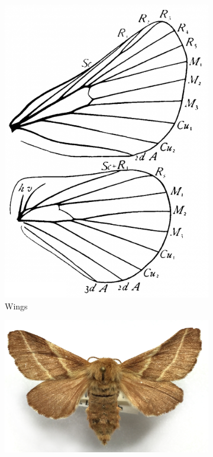 \documentclass[letterpaper, 11pt]{article}
\begin{document}
\begin{figure}[ht!]
    \centering
    \begin{subfigure}[ht!]{0.3\textwidth}
        \includegraphics[width=\textwidth]{LasiocampidWings}
        \caption{Wings \citep[Fig. 69]{comstock1918wings}}
        \label{fig:lasiocampid1}
    \end{subfigure}
    \hfill %
    \begin{subfigure}[ht!]{0.5\textwidth}
        \includegraphics[width=\textwidth]{LasiocampidHabitus}

\end{subfigure}
\end{figure}
\end{document}
